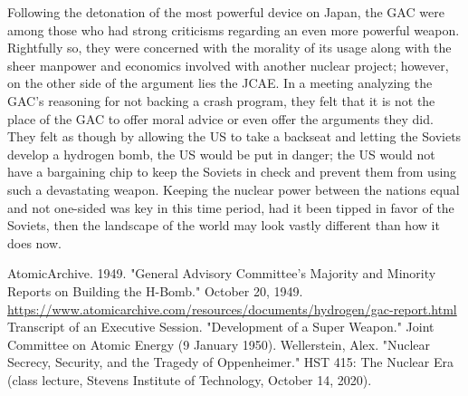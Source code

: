 \documentclass[12pt]{turabian-researchpaper}
\begin{document}
Following the detonation of the most powerful device on Japan, the GAC were among those who had strong criticisms regarding an even more powerful weapon. Rightfully so, they were concerned with the morality of its usage along with the sheer manpower and economics involved with another nuclear project; however, on the other side of the argument lies the JCAE. In a meeting analyzing the GAC's reasoning for not backing a crash program, they felt that it is not the place of the GAC to offer moral advice or even offer the arguments they did. They felt as though by allowing the US to take a backseat and letting the Soviets develop a hydrogen bomb, the US would be put in danger; the US would not have a bargaining chip to keep the Soviets in check and prevent them from using such a devastating weapon. Keeping the nuclear power between the nations equal and not one-sided was key in this time period, had it been tipped in favor of the Soviets, then the landscape of the world may look vastly different than how it does now.

\newpage

\begin{thebibliography}{3}
	 AtomicArchive. 1949. "General Advisory Committee's Majority and Minority Reports on Building the H-Bomb." October 20, 1949. \url{https://www.atomicarchive.com/resources/documents/hydrogen/gac-report.html}
	 Transcript of an Executive Session. "Development of a Super Weapon." Joint Committee on Atomic Energy (9 January 1950).
	 Wellerstein, Alex. "Nuclear Secrecy, Security, and the Tragedy of Oppenheimer." HST 415: The Nuclear Era (class lecture, Stevens Institute of Technology, October 14, 2020).
\end{thebibliography}
\end{document}
